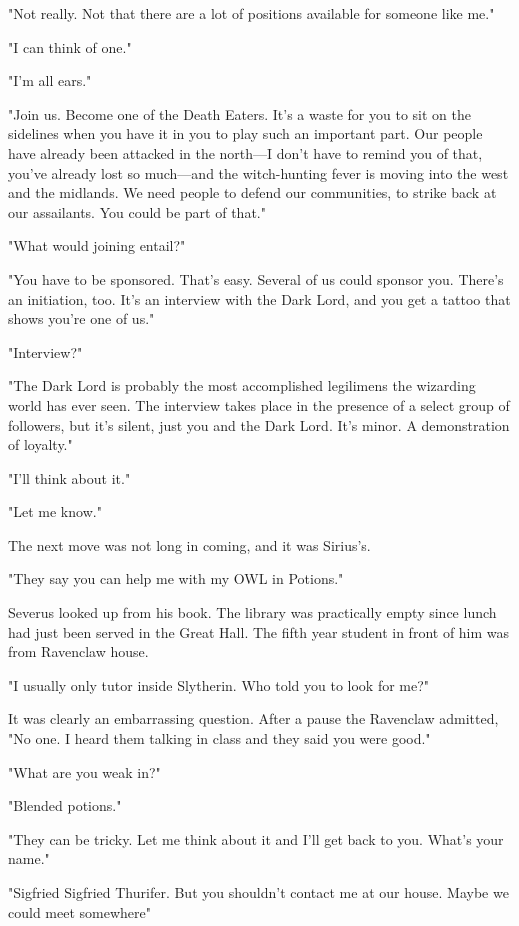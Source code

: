 "Not really. Not that there are a lot of positions available for someone like me."

"I can think of one."

"I'm all ears."

"Join us. Become one of the Death Eaters. It's a waste for you to sit on the sidelines when you have it in you to play such an important part. Our people have already been attacked in the north—I don't have to remind you of that, you've already lost so much—and the witch-hunting fever is moving into the west and the midlands. We need people to defend our communities, to strike back at our assailants. You could be part of that."

"What would joining entail?"

"You have to be sponsored. That's easy. Several of us could sponsor you. There's an initiation, too. It's an interview with the Dark Lord, and you get a tattoo that shows you're one of us."

"Interview?"

"The Dark Lord is probably the most accomplished legilimens the wizarding world has ever seen. The interview takes place in the presence of a select group of followers, but it's silent, just you and the Dark Lord. It's minor. A demonstration of loyalty."

"I'll think about it."

"Let me know."

The next move was not long in coming, and it was Sirius's.

"They say you can help me with my OWL in Potions."

Severus looked up from his book. The library was practically empty since lunch had just been served in the Great Hall. The fifth year student in front of him was from Ravenclaw house.

"I usually only tutor inside Slytherin. Who told you to look for me?"

It was clearly an embarrassing question. After a pause the Ravenclaw admitted, "No one. I heard them talking in class and they said you were good."

"What are you weak in?"

"Blended potions."

"They can be tricky. Let me think about it and I'll get back to you. What's your name."

"Sigfried{\el} Sigfried Thurifer. But you shouldn't contact me at our house. Maybe we could meet somewhere{\el}"

